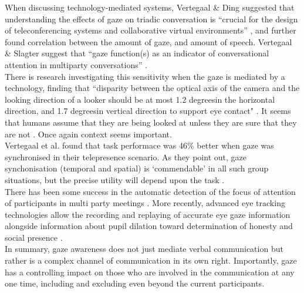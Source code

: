 When discussing technology-mediated systems, Vertegaal \& Ding suggested that understanding the effects of gaze on triadic conversation is ``crucial for the design of teleconferencing systems and collaborative virtual environments'' \cite{Vertegaal2002}, and further found correlation between the amount of gaze, and amount of speech. Vertegaal \& Slagter suggest that ``gaze function(s) as an indicator of conversational attention in multiparty conversations'' \cite{Vertegaal2001}. \\        
 There is research investigating this sensitivity when the gaze is mediated by a technology, finding that ``disparity between the optical axis of the camera and the looking direction of a looker should be at most 1.2 degreesin the horizontal direction, and 1.7 degreesin vertical direction to support eye contact" \cite{Eijk2010, Bock2008}. It seems that humans assume that they are being looked at unless they are sure that they are not \cite{Chen2002}. Once again context seems important.\\
Vertegaal et al. found that task performace was 46\% better when gaze was synchronised in their telepresence scenario. As they point out, gaze synchonisation (temporal and spatial) is `commendable' in all such group situations, but the precise utility will depend upon the task \cite{Vertegaal2002}.\\
There has been some success in the automatic detection of the focus of attention of participants in multi party meetings \cite{Stiefelhagen2001, Stiefelhagen2002}.  More recently, advanced eye tracking technologies allow the recording and replaying of accurate eye gaze information \cite{Steptoe2009} alongside information about pupil dilation toward determination of honesty and social presence \cite{Steptoe2010a}.\\               
In summary, gaze awareness does not just mediate verbal communication but rather is a complex channel of communication in its own right. Importantly, gaze has a controlling impact on those who are involved in the communication at any one time, including and excluding even beyond the current participants. \\
